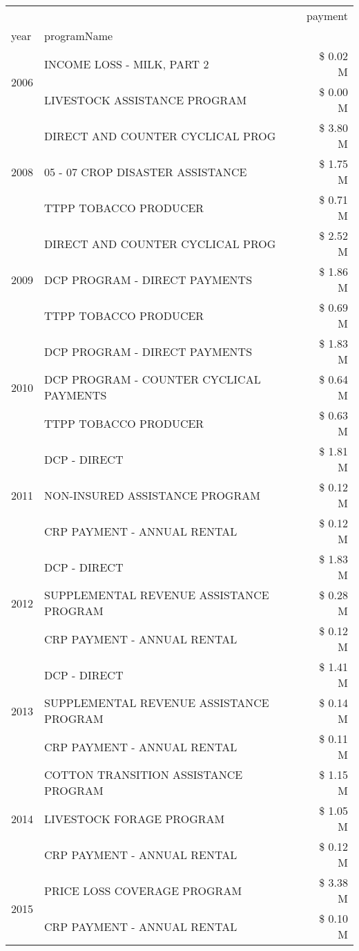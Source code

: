 \begin{tabular}{llr}
\toprule
 &  & payment \\
year & programName &  \\
\midrule
\multirow[t]{2}{*}{2006} & INCOME LOSS - MILK, PART 2 & \$ 0.02 M \\
 & LIVESTOCK ASSISTANCE PROGRAM & \$ 0.00 M \\
\cline{1-3}
\multirow[t]{3}{*}{2008} & DIRECT AND COUNTER CYCLICAL PROG & \$ 3.80 M \\
 & 05 - 07 CROP DISASTER ASSISTANCE & \$ 1.75 M \\
 & TTPP TOBACCO PRODUCER & \$ 0.71 M \\
\cline{1-3}
\multirow[t]{3}{*}{2009} & DIRECT AND COUNTER CYCLICAL PROG & \$ 2.52 M \\
 & DCP PROGRAM - DIRECT PAYMENTS & \$ 1.86 M \\
 & TTPP TOBACCO PRODUCER & \$ 0.69 M \\
\cline{1-3}
\multirow[t]{3}{*}{2010} & DCP PROGRAM - DIRECT PAYMENTS & \$ 1.83 M \\
 & DCP PROGRAM - COUNTER CYCLICAL PAYMENTS & \$ 0.64 M \\
 & TTPP TOBACCO PRODUCER & \$ 0.63 M \\
\cline{1-3}
\multirow[t]{3}{*}{2011} & DCP - DIRECT & \$ 1.81 M \\
 & NON-INSURED ASSISTANCE PROGRAM & \$ 0.12 M \\
 & CRP PAYMENT - ANNUAL RENTAL & \$ 0.12 M \\
\cline{1-3}
\multirow[t]{3}{*}{2012} & DCP - DIRECT & \$ 1.83 M \\
 & SUPPLEMENTAL REVENUE ASSISTANCE PROGRAM & \$ 0.28 M \\
 & CRP PAYMENT - ANNUAL RENTAL & \$ 0.12 M \\
\cline{1-3}
\multirow[t]{3}{*}{2013} & DCP - DIRECT & \$ 1.41 M \\
 & SUPPLEMENTAL REVENUE ASSISTANCE PROGRAM & \$ 0.14 M \\
 & CRP PAYMENT - ANNUAL RENTAL & \$ 0.11 M \\
\cline{1-3}
\multirow[t]{3}{*}{2014} & COTTON TRANSITION ASSISTANCE PROGRAM & \$ 1.15 M \\
 & LIVESTOCK FORAGE PROGRAM & \$ 1.05 M \\
 & CRP PAYMENT - ANNUAL RENTAL & \$ 0.12 M \\
\cline{1-3}
\multirow[t]{3}{*}{2015} & PRICE LOSS COVERAGE PROGRAM & \$ 3.38 M \\
 & CRP PAYMENT - ANNUAL RENTAL & \$ 0.10 M \\

\end{tabular}
